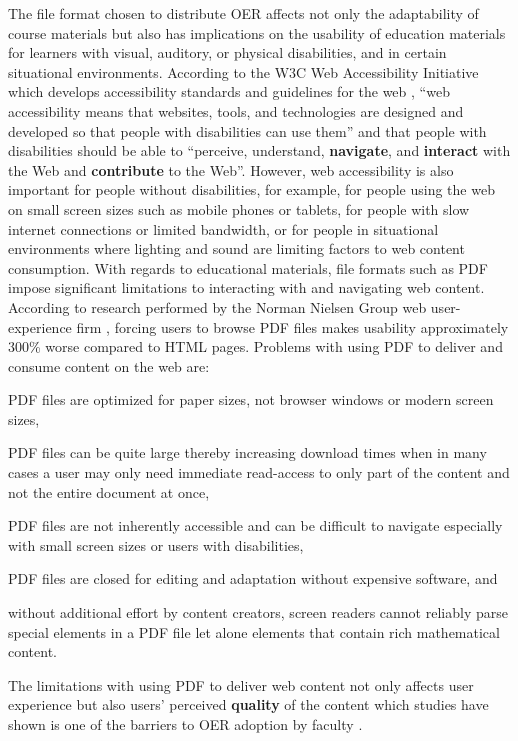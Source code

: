 \documentclass[11pt]{article}
\begin{document}
The file format chosen to distribute OER affects not only the adaptability of course materials but also has implications on the usability of education materials for learners with visual, auditory, or physical disabilities, and in certain situational environments.  According to the W3C Web Accessibility Initiative which develops accessibility standards and guidelines for the web \cite{w3cwai}, ``web accessibility means that websites, tools, and technologies are designed and developed so that people with disabilities can use them'' and that people with disabilities should be able to ``perceive, understand, \textbf{navigate}, and \textbf{interact} with the Web and \textbf{contribute} to the Web''.  However, web accessibility is also important for people without disabilities, for example, for people using the web on small screen sizes such as mobile phones or tablets, for people with slow internet connections or limited bandwidth, or for people in situational environments where lighting and sound are limiting factors to web content consumption.  With regards to educational materials, file formats such as PDF impose significant limitations to interacting with and navigating web content.  According to research performed by the Norman Nielsen Group  web user-experience firm \cite{JN-AK:20}, forcing users to browse PDF files makes usability approximately 300\% worse compared to HTML pages.  Problems with using PDF to deliver and consume content on the web are:
\begin{compactitem}
\item PDF files are optimized for paper sizes, not browser windows or modern screen sizes, 
\item PDF files can be quite large thereby increasing download times when in many cases a user may only need immediate read-access to only part of the content and not the entire document at once,
\item PDF files are not inherently accessible and can be difficult to navigate especially with small screen sizes or users with disabilities,
\item PDF files are closed for editing and adaptation without expensive software, and
\item without additional effort by content creators, screen readers cannot reliably parse special elements in a PDF file let alone elements that contain rich mathematical content.
\end{compactitem}
The limitations with using PDF to deliver web content not only affects user experience but also users' perceived \textbf{quality} of the content which studies have shown is one of the barriers to OER adoption by faculty \cite{OB-RB:16, RJ-RP-CH:2016, JS-JS:2018}.
\end{document}
